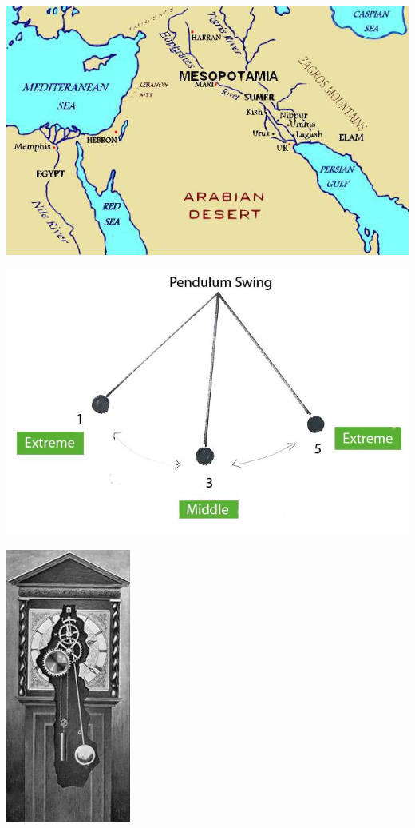 \documentclass[11pt]{article}
\begin{document}
\includegraphics{sumeria.jpg}







\includegraphics{pendulum.png}

\includegraphics{pendulumclock.jpg}
\end{document}
